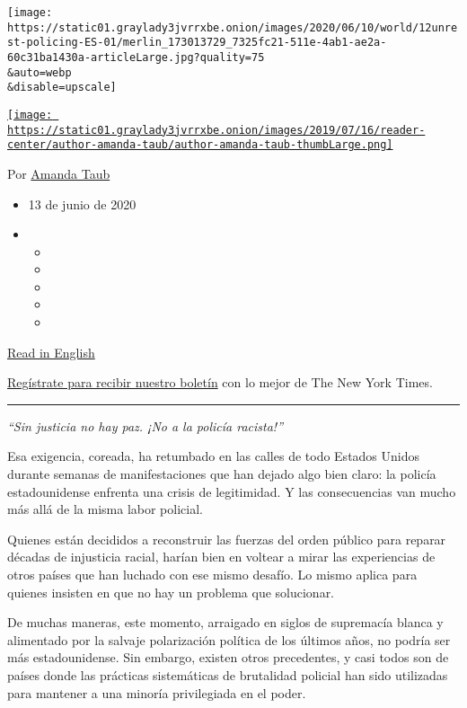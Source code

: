 \texttt{[image: https://static01.graylady3jvrrxbe.onion/images/2020/06/10/world/12unrest-policing-ES-01/merlin\_173013729\_7325fc21-511e-4ab1-ae2a-60c31ba1430a-articleLarge.jpg?quality=75\\\&auto=webp\\\&disable=upscale]}

\href{https://www.nytimes3xbfgragh.onion/by/amanda-taub}{\texttt{[image: https://static01.graylady3jvrrxbe.onion/images/2019/07/16/reader-center/author-amanda-taub/author-amanda-taub-thumbLarge.png]}}

Por \href{https://www.nytimes3xbfgragh.onion/by/amanda-taub}{Amanda
Taub}

\begin{itemize}
\item
  13 de junio de 2020
\item
  \begin{itemize}
  \item
  \item
  \item
  \item
  \item
  \end{itemize}
\end{itemize}

\href{https://www.nytimes3xbfgragh.onion/2020/06/11/world/police-brutality-protests.html}{Read
in English}

\href{https://www.nytimes3xbfgragh.onion/newsletters/el-times}{Regístrate
para recibir nuestro boletín} con lo mejor de The New York Times.

\begin{center}\rule{0.5\linewidth}{\linethickness}\end{center}

\emph{``Sin justicia no hay paz. ¡No a la policía racista!''}

Esa exigencia, coreada, ha retumbado en las calles de todo Estados
Unidos durante semanas de manifestaciones que han dejado algo bien
claro: la policía estadounidense enfrenta una crisis de legitimidad. Y
las consecuencias van mucho más allá de la misma labor policial.

Quienes están decididos a reconstruir las fuerzas del orden público para
reparar décadas de injusticia racial, harían bien en voltear a mirar las
experiencias de otros países que han luchado con ese mismo desafío. Lo
mismo aplica para quienes insisten en que no hay un problema que
solucionar.

De muchas maneras, este momento, arraigado en siglos de supremacía
blanca y alimentado por la salvaje polarización política de los últimos
años, no podría ser más estadounidense. Sin embargo, existen otros
precedentes, y casi todos son de países donde las prácticas sistemáticas
de brutalidad policial han sido utilizadas para mantener a una minoría
privilegiada en el poder.

